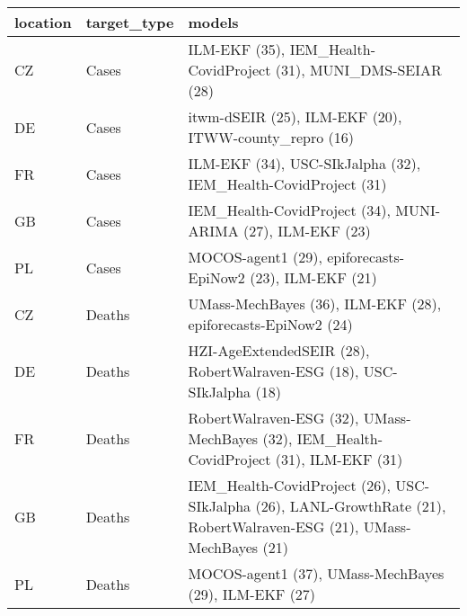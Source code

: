 
\begin{tabular}{l|l|l}
\hline
location & target\_type & models\\
\hline
CZ & Cases & ILM-EKF (35), IEM\_Health-CovidProject (31), MUNI\_DMS-SEIAR (28)\\
\hline
DE & Cases & itwm-dSEIR (25), ILM-EKF (20), ITWW-county\_repro (16)\\
\hline
FR & Cases & ILM-EKF (34), USC-SIkJalpha (32), IEM\_Health-CovidProject (31)\\
\hline
GB & Cases & IEM\_Health-CovidProject (34), MUNI-ARIMA (27), ILM-EKF (23)\\
\hline
PL & Cases & MOCOS-agent1 (29), epiforecasts-EpiNow2 (23), ILM-EKF (21)\\
\hline
CZ & Deaths & UMass-MechBayes (36), ILM-EKF (28), epiforecasts-EpiNow2 (24)\\
\hline
DE & Deaths & HZI-AgeExtendedSEIR (28), RobertWalraven-ESG (18), USC-SIkJalpha (18)\\
\hline
FR & Deaths & RobertWalraven-ESG (32), UMass-MechBayes (32), IEM\_Health-CovidProject (31), ILM-EKF (31)\\
\hline
GB & Deaths & IEM\_Health-CovidProject (26), USC-SIkJalpha (26), LANL-GrowthRate (21), RobertWalraven-ESG (21), UMass-MechBayes (21)\\
\hline
PL & Deaths & MOCOS-agent1 (37), UMass-MechBayes (29), ILM-EKF (27)\\
\hline
\end{tabular}